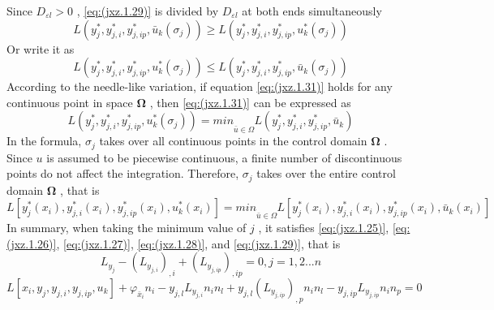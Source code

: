 Since $ D_ {\varepsilon l}>0 $ , \ref{eq:(jxz.1.29)} is divided by $ D_ {\varepsilon l}$  at both ends simultaneously
\begin{equation} \label{eq:(jxz.1.30)}    
L(y^*_j,y^*_{j,i},y^*_{j,ip},\bar {u}_k (\sigma_j)) \geq L(y^*_j,y^*_{j,i},y^*_{j,ip},u^*_k(\sigma_j))
\end{equation}
Or write it as
\begin{equation} \label{eq:(jxz.1.31)}    
L(y^*_j,y^*_{j,i},y^*_{j,ip},u^*_k(\sigma_j)) \leq L(y^*_j,y^*_{j,i},y^*_{j,ip},\bar {u}_k (\sigma_j))
\end{equation}
According to the needle-like variation, if equation \ref{eq:(jxz.1.31)} holds for any continuous point in space $ \bm \Omega $ , then \ref{eq:(jxz.1.31)} can be expressed as
\begin{equation} \label{eq:(jxz.1.32)}    
L(y^*_j,y^*_{j,i},y^*_{j,ip},u^*_k(\sigma_j)) = min\underset{\bar u \in \Omega}{}L(y^*_j,y^*_{j,i},y^*_{j,ip},\bar {u}_k )
\end{equation}
In the formula, $ \sigma_j $ takes over all continuous points in the control domain $ \bm \Omega $ . Since $ u $ is assumed to be piecewise continuous, a finite number of discontinuous points do not affect the integration. Therefore, $ \sigma_j $ takes over the entire control domain $ \bm \Omega $ , that is
\begin{equation} \label{eq:(jxz.1.33)}    
L[y^*_j(x_i),y^*_{j,i}(x_i),y^*_{j,ip}(x_i),u^*_k(x_i)] = min\underset{\bar u \in \Omega}{}L[y^*_j(x_i),y^*_{j,i}(x_i),y^*_{j,ip}(x_i),\bar {u}_k (x_i)]
\end{equation}
In summary, when taking the minimum value of $ j$  , it satisfies \ref{eq:(jxz.1.25)}, \ref{eq:(jxz.1.26)}, \ref{eq:(jxz.1.27)}, \ref{eq:(jxz.1.28)}, and \ref{eq:(jxz.1.29)}, that is
\begin{equation} \label{eq:(jxz.1.25)}    
L_{y_j} - \left(L_{y_{j,i}}\right)_{,i}+\left(L_{y_{j,ip}}\right)_{,ip} =0,j=1,2...n
\end{equation}
\begin{equation} \label{eq:(jxz.1.26)}    
L[x_i,y_j,y_{j,i},y_{j,ip},u_k]+ \varphi_{\bar {x}_i } n_i 
-y_{j,l} L_{y_{j,i}} n_i n_l   + y_{j,l} \left(L_{y_{j,ip}}\right)_{,p} n_i n_l 
-y_{j,ip} L_{y_{j,ip}} n_i  n_p =0
\end{equation}
